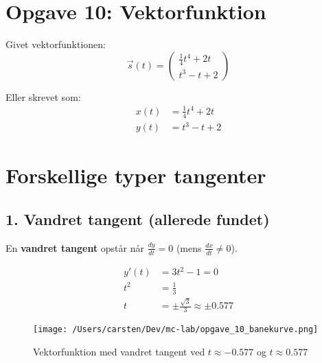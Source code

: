 \documentclass[a4paper,12pt]{article}
\begin{document}
\section{Opgave 10: Vektorfunktion}

Givet vektorfunktionen:
\[
\vec{s}(t) = \begin{pmatrix} \frac{1}{4}t^4 + 2t \\ t^3 - t + 2 \end{pmatrix}
\]

Eller skrevet som:
\begin{align*}
x(t) &= \frac{1}{4}t^4 + 2t \\
y(t) &= t^3 - t + 2
\end{align*}

\section{Forskellige typer tangenter}

\subsection{1. Vandret tangent (allerede fundet)}

En \textbf{vandret tangent} opstår når $\frac{dy}{dt} = 0$ (mens $\frac{dx}{dt} \neq 0$).

\begin{align*}
y'(t) &= 3t^2 - 1 = 0 \\
t^2 &= \frac{1}{3} \\
t &= \pm\frac{\sqrt{3}}{3} \approx \pm 0.577
\end{align*}

\begin{figure}[h]
    \centering
    \texttt{[image: /Users/carsten/Dev/mc-lab/opgave\_10\_banekurve.png]}
    \caption{Vektorfunktion med vandret tangent ved $t \approx -0.577$ og $t \approx 0.577$}
\end{figure}
\end{document}
